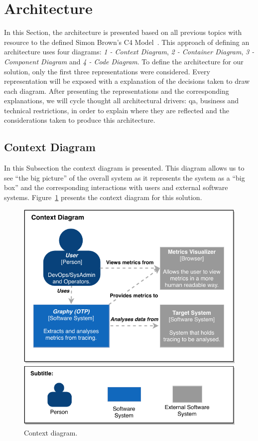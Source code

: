 \section{Architecture}
\label{sec:architecture}

In this Section, the architecture is presented based on all previous topics with resource to the defined Simon Brown’s C4 Model~\cite{simon_browns_c4_model}. This approach of defining an architecture uses four diagrams: \emph{1 - Context Diagram}, \emph{2 - Container Diagram}, \emph{3 - Component Diagram} and \emph{4 - Code Diagram}. To define the architecture for our solution, only the first three representations were considered. Every representation will be exposed with a explanation of the decisions taken to draw each diagram. After presenting the representations and the corresponding explanations, we will cycle thought all architectural drivers: \gls{qa}, business and technical restrictions, in order to explain where they are reflected and the considerations taken to produce this architecture.

\subsection{Context Diagram}
\label{subsec:context_diagram}

In this Subsection the context diagram is presented. This diagram allows us to see ``the big picture'' of the overall system as it represents the system as a ``big box'' and the corresponding interactions with users and external software systems. Figure~\ref{fig:context_diagram} presents the context diagram for this solution.

\begin{figure}[H]
    \centering
    \includegraphics[width=1.0\textwidth]{images/context_diagram.pdf}
    \caption{Context diagram.}
    \label{fig:context_diagram}
\end{figure}

